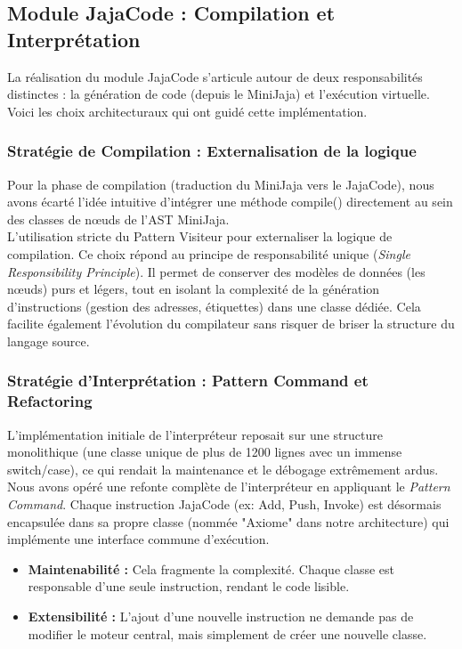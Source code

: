 \subsection{Module JajaCode : Compilation et Interprétation}

La réalisation du module JajaCode s'articule autour de deux responsabilités distinctes : la génération de code (depuis le MiniJaja) et l'exécution virtuelle. Voici les choix architecturaux qui ont guidé cette implémentation.

\subsubsection{Stratégie de Compilation : Externalisation de la logique}

Pour la phase de compilation (traduction du MiniJaja vers le JajaCode), nous avons écarté l'idée intuitive d'intégrer une méthode compile() directement au sein des classes de nœuds de l'AST MiniJaja.\\

L'utilisation stricte du Pattern Visiteur pour externaliser la logique de compilation.  Ce choix répond au principe de responsabilité unique (\textit{Single Responsibility Principle}). Il permet de conserver des modèles de données (les nœuds) purs et légers, tout en isolant la complexité de la génération d'instructions (gestion des adresses, étiquettes) dans une classe dédiée. Cela facilite également l'évolution du compilateur sans risquer de briser la structure du langage source.

\subsubsection{Stratégie d'Interprétation : Pattern Command et Refactoring}

L'implémentation initiale de l'interpréteur reposait sur une structure monolithique (une classe unique de plus de 1200 lignes avec un immense switch/case), ce qui rendait la maintenance et le débogage extrêmement ardus.\\

Nous avons opéré une refonte complète de l'interpréteur en appliquant le \textit{Pattern Command}. Chaque instruction JajaCode (ex: Add, Push, Invoke) est désormais encapsulée dans sa propre classe (nommée "Axiome" dans notre architecture) qui implémente une interface commune d'exécution.\begin{itemize} \item \textbf{Maintenabilité :} Cela fragmente la complexité. Chaque classe est responsable d'une seule instruction, rendant le code lisible. \item \textbf{Extensibilité :} L'ajout d'une nouvelle instruction ne demande pas de modifier le moteur central, mais simplement de créer une nouvelle classe. \end{itemize}

